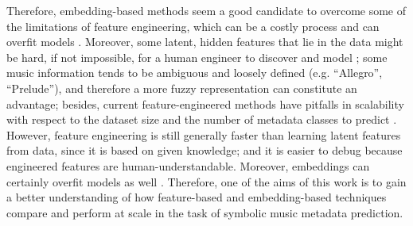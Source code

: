 \documentclass{article}
\begin{document}
Therefore, embedding-based methods seem a good candidate to overcome some of the limitations of feature engineering, which can be a costly process and can overfit models \citep{guyon2003introduction}. Moreover, some latent, hidden features that lie in the data might be hard, if not impossible, for a human engineer to discover and model \citep{wilcke2017knowledge};
some music information tends to be ambiguous and loosely defined (e.g. ``Allegro'', ``Prelude''), and therefore a more fuzzy representation can constitute an advantage;
besides, current feature-engineered methods have pitfalls in scalability with respect to the dataset size and the number of metadata classes to predict \citep{mckay2010datasetslac}. However, feature engineering is still generally faster than learning latent features from data, since it is based on given knowledge; and it is easier to debug because engineered features are human-understandable. Moreover, embeddings can certainly overfit models as well \citep{weng2019overfit}. Therefore, one of the aims of this work is to gain a better understanding of how feature-based and embedding-based techniques compare and perform at scale in the task of symbolic music metadata prediction.
\end{document}
